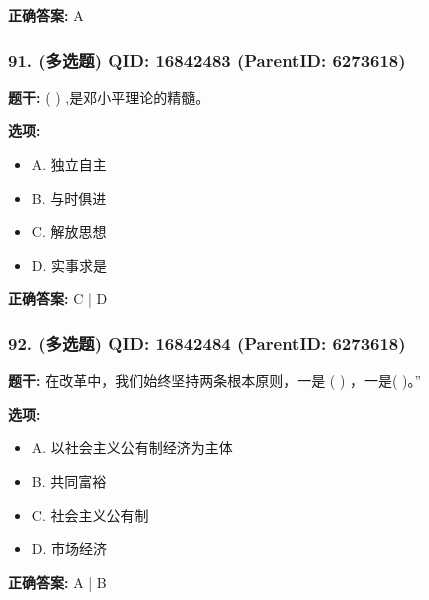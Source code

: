 \documentclass[12pt,UTF8]{ctexart}
\begin{document}
\textbf{正确答案:}
A

\vspace{0.3em}\hrulefill\vspace{0.7em}

\subsubsection*{91. (多选题) \small QID: 16842483 (ParentID: 6273618)}

\textbf{题干:}
( ) ,是邓小平理论的精髓。



\textbf{选项:}
\begin{itemize}[leftmargin=*]

  \item A. 独立自主

  \item B. 与时俱进

  \item C. 解放思想

  \item D. 实事求是

\end{itemize}

\textbf{正确答案:}
C | D

\vspace{0.3em}\hrulefill\vspace{0.7em}

\subsubsection*{92. (多选题) \small QID: 16842484 (ParentID: 6273618)}

\textbf{题干:}
在改革中，我们始终坚持两条根本原则，一是 ( ) ，一是( )。”



\textbf{选项:}
\begin{itemize}[leftmargin=*]

  \item A. 以社会主义公有制经济为主体

  \item B. 共同富裕

  \item C. 社会主义公有制

  \item D. 市场经济

\end{itemize}

\textbf{正确答案:}
A | B
\end{document}
